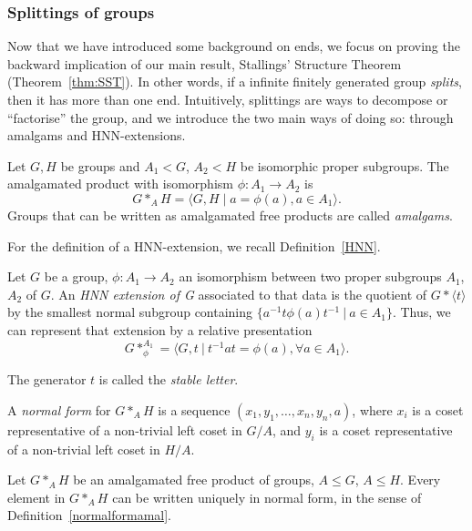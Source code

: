 \subsubsection{Splittings of groups}
Now that we have introduced some background on ends, we focus on proving the backward implication of our main result, Stallings' Structure Theorem (Theorem~\ref{thm:SST}). In other words, if a infinite finitely generated group \emph{splits}, then it has more than one end. Intuitively, splittings are ways to decompose or ``factorise'' the group, and we introduce the two main ways of doing so: through amalgams and HNN-extensions.

 \begin{definition}\label{defnamalgamatedproduct}
     Let \(G,H\) be groups and \(A_1 < G\), \(A_2 < H\) be isomorphic proper subgroups. The amalgamated product with isomorphism \(\phi: A_1 \to A_2\) is 
     \[
     G *_A H = \langle G,H \mid a = \phi(a), a \in A_1 \rangle .
     \]
     Groups that can be written as amalgamated free products are called \emph{amalgams}.
 \end{definition}

For the definition of a HNN-extension, we recall Definition~\ref{HNN}.

 \begin{definition}
     Let $G$ be a group, $\phi: A_1 \to A_2$ an isomorphism between two proper subgroups $A_1$,$A_2$ of $G$. An \emph{HNN extension of G} associated to that data is the quotient of $G \ast \langle t \rangle$ by the smallest normal subgroup containing $\{a^{-1}t\phi(a)t^{-1} \: | \: a \in A_1 \}$. Thus, we can represent that extension by a relative presentation 
    \[G \ast_\phi^{A_1} = \langle G,t \: | \: t^{-1}at = \phi(a), \forall a \in A_1 \rangle. \]

    The generator \(t\) is called the \emph{stable letter}.
 \end{definition}

\begin{definition}
\label{normalformamal}
    A \emph{normal form} for \(G *_A H\) is a sequence \((x_1, y_1, \dots,x_n, y_n, a)\), where \(x_i\) is a coset representative of a non-trivial left coset in \(G/A\), and \(y_i\) is a coset representative of a non-trivial left coset in \(H/A\).
\end{definition}

\begin{lemma}
    Let \(G *_A H\) be an amalgamated free product of groups, \(A \leq G\), \(A \leq H\). Every element in \(G *_A H\) can be written uniquely in normal form, in the sense of Definition~\ref{normalformamal}. 
\end{lemma}

